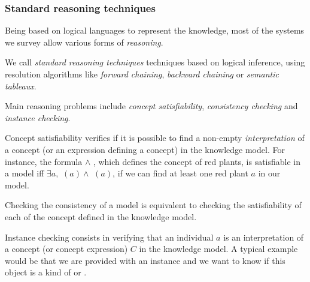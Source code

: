 \begin{scriptsize}
\begin{center}
\end{center}
\end{scriptsize}


\subsubsection{Standard reasoning techniques}

Being based on logical languages to represent the knowledge, most of the
systems we survey allow various forms of \emph{reasoning}.

We call \emph{standard reasoning techniques} techniques based on logical
inference, using resolution algorithms like \emph{forward chaining},
\emph{backward chaining} or \emph{semantic tableaux}.

Main reasoning problems include \emph{concept satisfiability},
\emph{consistency checking} and \emph{instance checking}.

Concept satisfiability verifies if it is possible to find a non-empty
\emph{interpretation} of a concept (or an expression defining a concept) in the
knowledge model. For instance, the formula  $\land$
, which defines the concept of red plants, is satisfiable in a
model  iff $\exists a, $ $(a) \land$
$(a)$, \ie if we can find at least one red plant $a$ in our
model.

Checking the consistency of a model is equivalent to checking the
satisfiability of each of the concept defined in the knowledge model.

Instance checking consists in verifying that an individual $a$ is an
interpretation of a concept (or concept expression) $C$ in the knowledge model.
A typical example would be that we are provided with an instance
 and we want to know if this object is a kind of
 or .

